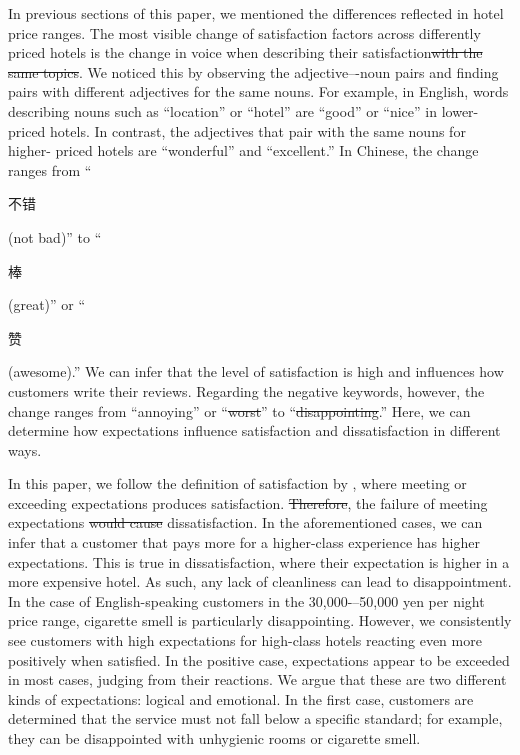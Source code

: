 \documentclass[smallextended,natbib]{svjour3}       %
\providecommand{\DIFadd}[1]{{\protect\color{blue}\uwave{#1}}} %
\providecommand{\DIFdel}[1]{{\protect\color{red}\sout{#1}}}                      %
\providecommand{\DIFaddbegin}{} %
\providecommand{\DIFaddend}{} %
\providecommand{\DIFdelbegin}{} %
\providecommand{\DIFdelend}{} %
\newcommand{\DIFscaledelfig}{0.5}
\newlength{\DIFdelgraphicswidth} %
\newlength{\DIFdelgraphicsheight} %
\newcommand{\DIFaddincludegraphics}[2][]{{\color{blue}\fbox{\DIFOincludegraphics[#1]{#2}}}} %
\newcommand{\DIFdelincludegraphics}[2][]{%
\sbox{\DIFdelgraphicsbox}{\DIFOincludegraphics[#1]{#2}}%
\settoboxwidth{\DIFdelgraphicswidth}{\DIFdelgraphicsbox} %
\settoboxtotalheight{\DIFdelgraphicsheight}{\DIFdelgraphicsbox} %
\scalebox{\DIFscaledelfig}{%
\parbox[b]{\DIFdelgraphicswidth}{\usebox{\DIFdelgraphicsbox}\\[-\baselineskip] \rule{\DIFdelgraphicswidth}{0em}}\llap{\resizebox{\DIFdelgraphicswidth}{\DIFdelgraphicsheight}{%
\setlength{\unitlength}{\DIFdelgraphicswidth}%
\begin{picture}(1,1)%
\thicklines\linethickness{2pt} %
{\color[rgb]{1,0,0}\put(0,0){\framebox(1,1){}}}%
{\color[rgb]{1,0,0}\put(0,0){\line( 1,1){1}}}%
{\color[rgb]{1,0,0}\put(0,1){\line(1,-1){1}}}%
\end{picture}%
}\hspace*{3pt}}} %
} %
\DeclareRobustCommand{\DIFaddbegin}{\DIFOaddbegin \let\includegraphics\DIFaddincludegraphics} %
\DeclareRobustCommand{\DIFaddend}{\DIFOaddend \let\includegraphics\DIFOincludegraphics} %
\DeclareRobustCommand{\DIFdelbegin}{\DIFOdelbegin \let\includegraphics\DIFdelincludegraphics} %
\DeclareRobustCommand{\DIFdelend}{\DIFOaddend \let\includegraphics\DIFOincludegraphics} %
\begin{document}
    In previous sections of this paper, we mentioned the differences reflected in hotel price ranges. The most visible change of satisfaction factors across differently priced hotels is the change in voice when describing their satisfaction\DIFdelbegin \DIFdel{with the same topics}\DIFdelend . We noticed this by observing the adjective–-noun pairs and finding pairs with different adjectives for the same nouns. For example, in English, words describing nouns such as ``location'' or ``hotel'' are ``good'' or ``nice'' in lower-priced hotels. In contrast, the adjectives that pair with the same nouns for higher- priced hotels are ``wonderful'' and ``excellent.'' In Chinese, the change ranges from ``\begin{CJK}{UTF8}{gbsn}不错\end{CJK} (not bad)'' to ``\begin{CJK}{UTF8}{gbsn}棒\end{CJK} (great)'' or ``\begin{CJK}{UTF8}{gbsn}赞\end{CJK} (awesome).'' We can infer that the level of satisfaction is high and influences how customers write their reviews. Regarding the negative keywords, however, the change ranges from ``annoying'' or ``\DIFdelbegin \DIFdel{worst}\DIFdelend \DIFaddbegin \DIFadd{disappointing}\DIFaddend '' to ``\DIFdelbegin \DIFdel{disappointing}\DIFdelend \DIFaddbegin \DIFadd{worst}\DIFaddend .'' Here, we can determine how expectations influence satisfaction and dissatisfaction in different ways.

    In this paper, we follow the definition of satisfaction by \cite{hunt1975}, where meeting or exceeding expectations produces satisfaction. \DIFdelbegin \DIFdel{Therefore}\DIFdelend \DIFaddbegin \DIFadd{Conversely}\DIFaddend , the failure of meeting expectations \DIFdelbegin \DIFdel{would cause }\DIFdelend \DIFaddbegin \DIFadd{causes }\DIFaddend dissatisfaction. In the aforementioned cases, we can infer that a customer that pays more for a higher-class experience has higher expectations. This is true in dissatisfaction, where their expectation is higher in a more expensive hotel. As such, any lack of cleanliness can lead to disappointment. In the case of English-speaking customers in the 30,000-–50,000 yen per night price range, cigarette smell is particularly disappointing. However, we consistently see customers with high expectations for high-class hotels reacting even more positively when satisfied. In the positive case, expectations appear to be exceeded in most cases, judging from their reactions. We argue that these are two different kinds of expectations: logical and emotional. In the first case, customers are determined that the service must not fall below a specific standard; for example, they can be disappointed with unhygienic rooms or cigarette smell.
\end{document}
